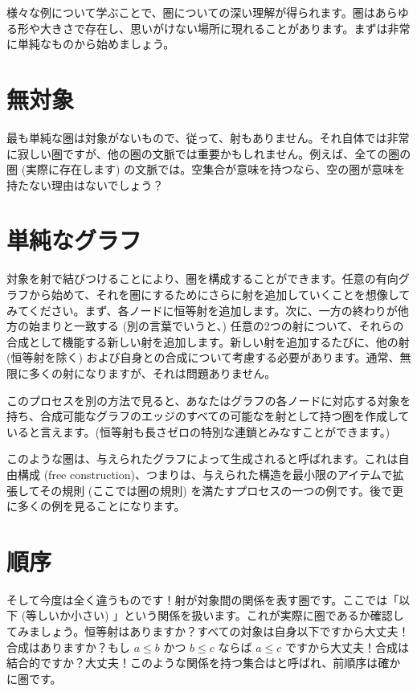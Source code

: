 
\lettrine[lhang=0.17]{様}{々な}例について学ぶことで、圏についての深い理解が得られます。圏はあらゆる形や大きさで存在し、思いがけない場所に現れることがあります。まずは非常に単純なものから始めましょう。

\section{無対象}

最も単純な圏は対象がないもので、従って、射もありません。それ自体では非常に寂しい圏ですが、他の圏の文脈では重要かもしれません。例えば、全ての圏の圏 (実際に存在します) の文脈では。空集合が意味を持つなら、空の圏が意味を持たない理由はないでしょう？

\section{単純なグラフ}

対象を射で結びつけることにより、圏を構成することができます。任意の有向グラフから始めて、それを圏にするためにさらに射を追加していくことを想像してみてください。まず、各ノードに恒等射を追加します。次に、一方の終わりが他方の始まりと一致する (別の言葉でいうと、) 任意の2つの射について、それらの合成として機能する新しい射を追加します。新しい射を追加するたびに、他の射 (恒等射を除く) および自身との合成について考慮する必要があります。通常、無限に多くの射になりますが、それは問題ありません。

このプロセスを別の方法で見ると、あなたはグラフの各ノードに対応する対象を持ち、合成可能なグラフのエッジのすべての可能なを射として持つ圏を作成していると言えます。(恒等射も長さゼロの特別な連鎖とみなすことができます。)

このような圏は、与えられたグラフによって生成されると呼ばれます。これは自由構成 (free construction)、つまりは、与えられた構造を最小限のアイテムで拡張してその規則 (ここでは圏の規則) を満たすプロセスの一つの例です。後で更に多くの例を見ることになります。

\section{順序}

そして今度は全く違うものです！射が対象間の関係を表す圏です。ここでは「以下 (等しいか小さい) 」という関係を扱います。これが実際に圏であるか確認してみましょう。恒等射はありますか？すべての対象は自身以下ですから大丈夫！合成はありますか？もし \(a \leqslant b\) かつ \(b \leqslant c\) ならば \(a \leqslant c\) ですから大丈夫！合成は結合的ですか？大丈夫！このような関係を持つ集合はと呼ばれ、前順序は確かに圏です。

